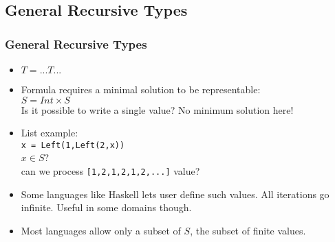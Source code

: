 \subsection{General Recursive Types}
\begin{frame}
 \frametitle{General Recursive Types}
\begin{itemize}[<+->]
 \item $T = ... T ...$
 \item Formula requires a minimal solution to be representable:\\
	$S = Int \times S$ \\
	Is it possible to write a single value? No minimum solution here!
 \item List example:\\
	\texttt{x = Left(1,Left(2,x))}\\
	$x \in S$?  \\
	can we process \texttt{[1,2,1,2,1,2,...]} value?
\item Some languages like \textsf{Haskell} lets user define such values. All iterations go
infinite. Useful in some domains though.
\item Most languages allow only a subset of $S$, the subset of finite values.
\end{itemize}
\end{frame}




